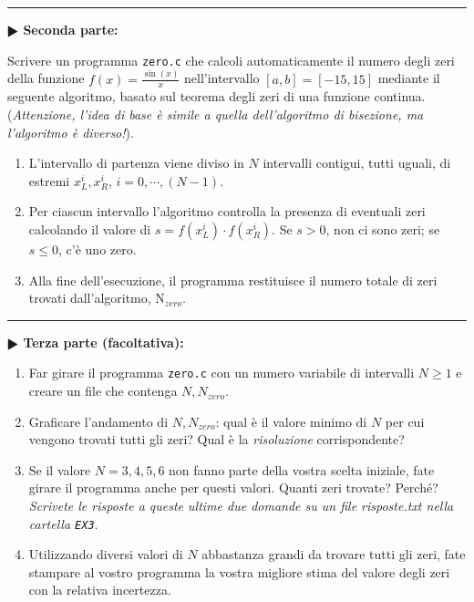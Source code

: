 \documentclass[11pt]{article}
\begin{document}
\hrule
\vspace{2mm}
\textbf{$\RHD$ Seconda parte:}

Scrivere un programma \texttt{zero.c} che calcoli automaticamente il numero degli zeri della funzione $f(x)=\frac{\sin(x)}{x}$ nell'intervallo $\left[a,b\right] = \left[-15,15 \right]$ mediante il seguente algoritmo,
basato sul teorema degli zeri di una funzione continua.
\\
({\em Attenzione, l'idea di base \`e simile a quella dell'algoritmo di bisezione, ma l'algoritmo \`e diverso!\/}).
\begin{enumerate}
\item L'intervallo di partenza viene diviso in $N$ intervalli contigui,
  tutti uguali, di estremi $x_L^{i}, x_R^{i}$, $i=0,\cdots,(N-1)$.
\item Per ciascun intervallo l'algoritmo controlla la presenza di eventuali 
zeri calcolando il valore di $s=f(x_L^{i})\cdot f(x_R^i)$. Se $s>0$,
non ci sono zeri; se $s \le 0$, c'\`e uno zero.
\item Alla fine dell'esecuzione, il programma restituisce il numero totale di zeri
trovati dall'algoritmo, N$_{zero}$.
\end{enumerate}

\newpage

\hrule
\vspace{2mm}
\textbf{$\RHD$ Terza parte (facoltativa):}
\begin{enumerate}
\item Far girare il programma \texttt{zero.c} con un numero variabile di intervalli 
$N \ge 1$ e creare un file che contenga $N, N_{zero}$.
\item Graficare l'andamento di $N, N_{zero}$: qual \`e il valore minimo di $N$
per cui vengono trovati tutti gli zeri? Qual \`e la {\em risoluzione\/} corrispondente?
\item Se il valore $N=3,4,5,6$ non fanno parte della vostra scelta iniziale, fate girare il programma anche per questi valori. Quanti zeri trovate? Perch\'e? 
{\em Scrivete le risposte a queste ultime due domande su un file risposte.txt
nella cartella \texttt{EX3}}.
\item Utilizzando diversi valori di $N$ abbastanza grandi da trovare tutti gli zeri,
fate stampare al vostro programma la vostra migliore stima del valore degli zeri con la relativa incertezza.
\end{enumerate}
\end{document}
